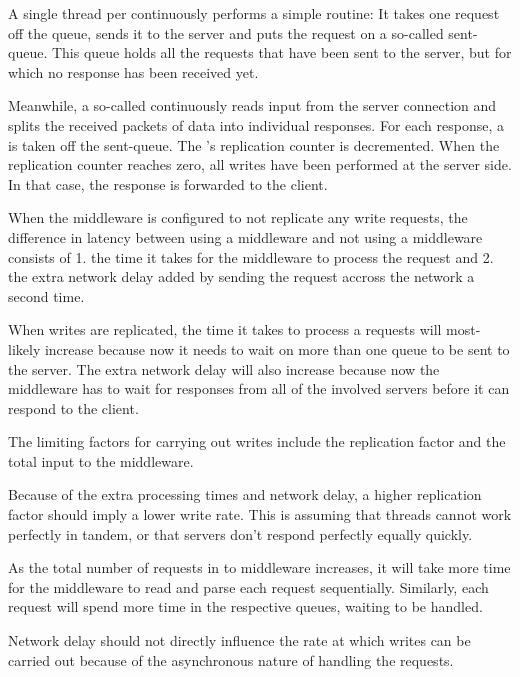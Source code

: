 \documentclass[11pt]{article}
\begin{document}
A single thread per  continuously performs a simple routine:
It takes one request off the queue, sends it to the server and puts the request on a so-called sent-queue.
This queue holds all the requests that have been sent to the server, but for which no response has been received yet.

Meanwhile, a so-called  continuously reads input from the server connection and splits the received packets of data into individual responses.
For each response, a  is taken off the sent-queue.
The 's replication counter is decremented.
When the replication counter reaches zero, all writes have been performed at the server side.
In that case, the response is forwarded to the client.


When the middleware is configured to not replicate any write requests, the difference in latency between using a middleware and not using a middleware consists of 1. the time it takes for the middleware to process the request and 2. the extra network delay added by sending the request accross the network a second time.

When writes are replicated, the time it takes to process a requests will most-likely increase because now it needs to wait on more than one queue to be sent to the server.
The extra network delay will also increase because now the middleware has to wait for responses from all of the involved servers before it can respond to the client.

The limiting factors for carrying out writes include the replication factor and the total input to the middleware.

Because of the extra processing times and network delay, a higher replication factor should imply a lower write rate.
This is assuming that threads cannot work perfectly in tandem, or that servers don't respond perfectly equally quickly.

As the total number of requests in to middleware increases, it will take more time for the middleware to read and parse each request sequentially.
Similarly, each request will spend more time in the respective queues, waiting to be handled.

Network delay should not directly influence the rate at which writes can be carried out because of the asynchronous nature of handling the requests.
\end{document}
